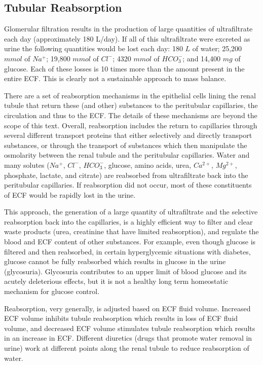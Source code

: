 \subsection{Tubular Reabsorption}

Glomerular filtration results in the production of large quantities of ultrafiltrate each day (approximately  180 L/day). If all of this ultrafiltrate were excreted as urine the following quantities would be lost each day: 180 $L$ of water; 25,200 $mmol$ of $Na^+$; 19,800 $mmol$ of $Cl^-$; 4320 $mmol$ of $HCO_{3}^{-}$; and 14,400 $mg$ of glucose. Each of these losses is 10 times more than the amount present in the entire ECF. This is clearly not a sustainable approach to mass balance. 

There are a set of reabsorption mechanisms in the epithelial cells lining the renal tubule that return these (and other) substances to the peritubular capillaries, the circulation and thus to the ECF. The details of these mechanisms are beyond the scope of this text. Overall, reabsorption includes the return to capillaries through several different transport proteins that either selectively and directly transport substances, or through the transport of substances which then manipulate the osmolarity between the renal tubule and the peritubular capillaries.  Water and many solutes ($Na^+$, $Cl^-$, $HCO_3^-$, glucose, amino acids, urea, $Ca^{2+}$, $Mg^{2+}$, phosphate, lactate, and citrate) are reabsorbed from ultrafiltrate back into the peritubular capillaries. If reabsorption did not occur, most of these constituents of ECF would be rapidly lost in the urine.

This approach, the generation of a large quantity of ultrafiltrate and the selective reabsorption back into the capillaries, is a highly efficient way to filter and clear waste products (urea, creatinine that have limited reabsorption), and regulate the blood and ECF content of other substances. For example, even though glucose is filtered and then reabsorbed, in certain hyperglycemic situations with diabetes, glucose cannot be fully reabsorbed which results in glucose in the urine (glycosuria).  Glycosuria contributes to an upper limit of blood glucose and its acutely deleterious effects, but it is not a healthy long term homeostatic mechanism for glucose control. 

Reabsorption, very generally, is adjusted based on ECF fluid volume. Increased ECF volume inhibits tubule reabsorption which results in loss of ECF fluid volume, and decreased ECF volume stimulates tubule reabsorption which results in an increase in ECF. Different diuretics (drugs that promote water removal in urine) work at different points along the renal tubule to reduce reabsorption of water.


